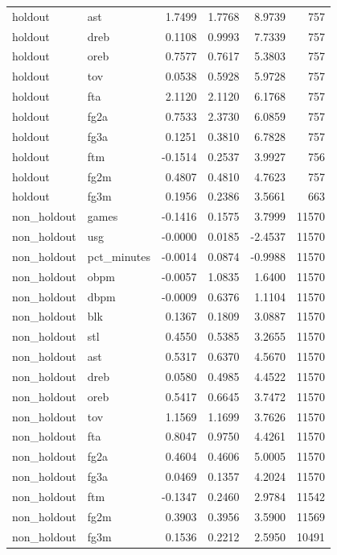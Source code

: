 \begin{table}
\begin{tabular}{llrrrr}
holdout & ast & 1.7499 & 1.7768 & 8.9739 & 757 \\
holdout & dreb & 0.1108 & 0.9993 & 7.7339 & 757 \\
holdout & oreb & 0.7577 & 0.7617 & 5.3803 & 757 \\
holdout & tov & 0.0538 & 0.5928 & 5.9728 & 757 \\
holdout & fta & 2.1120 & 2.1120 & 6.1768 & 757 \\
holdout & fg2a & 0.7533 & 2.3730 & 6.0859 & 757 \\
holdout & fg3a & 0.1251 & 0.3810 & 6.7828 & 757 \\
holdout & ftm & -0.1514 & 0.2537 & 3.9927 & 756 \\
holdout & fg2m & 0.4807 & 0.4810 & 4.7623 & 757 \\
holdout & fg3m & 0.1956 & 0.2386 & 3.5661 & 663 \\
non\_holdout & games & -0.1416 & 0.1575 & 3.7999 & 11570 \\
non\_holdout & usg & -0.0000 & 0.0185 & -2.4537 & 11570 \\
non\_holdout & pct\_minutes & -0.0014 & 0.0874 & -0.9988 & 11570 \\
non\_holdout & obpm & -0.0057 & 1.0835 & 1.6400 & 11570 \\
non\_holdout & dbpm & -0.0009 & 0.6376 & 1.1104 & 11570 \\
non\_holdout & blk & 0.1367 & 0.1809 & 3.0887 & 11570 \\
non\_holdout & stl & 0.4550 & 0.5385 & 3.2655 & 11570 \\
non\_holdout & ast & 0.5317 & 0.6370 & 4.5670 & 11570 \\
non\_holdout & dreb & 0.0580 & 0.4985 & 4.4522 & 11570 \\
non\_holdout & oreb & 0.5417 & 0.6645 & 3.7472 & 11570 \\
non\_holdout & tov & 1.1569 & 1.1699 & 3.7626 & 11570 \\
non\_holdout & fta & 0.8047 & 0.9750 & 4.4261 & 11570 \\
non\_holdout & fg2a & 0.4604 & 0.4606 & 5.0005 & 11570 \\
non\_holdout & fg3a & 0.0469 & 0.1357 & 4.2024 & 11570 \\
non\_holdout & ftm & -0.1347 & 0.2460 & 2.9784 & 11542 \\
non\_holdout & fg2m & 0.3903 & 0.3956 & 3.5900 & 11569 \\
non\_holdout & fg3m & 0.1536 & 0.2212 & 2.5950 & 10491 \\
\bottomrule
\end{tabular}
\end{table}
